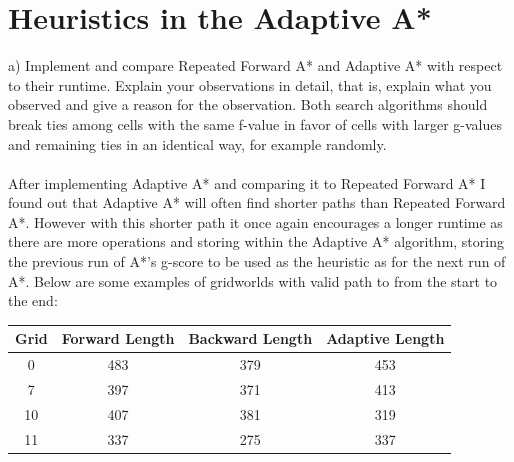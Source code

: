 \documentclass{article}
\begin{document}
\section{Heuristics in the Adaptive A*}
a) Implement and compare Repeated Forward A* and Adaptive A* with respect to their runtime. Explain your observations in detail, that is, explain what you observed and give a reason for
the observation. Both search algorithms should break ties among cells with the same f-value in favor of cells with larger g-values and remaining ties in an identical way, for example randomly.\\\\
After implementing Adaptive A* and comparing it to Repeated Forward A* I found out that Adaptive A* will often find shorter paths than Repeated Forward A*. However with this shorter path it once again encourages a longer runtime as there are more operations and storing within the Adaptive A* algorithm, storing the previous run of A*'s g-score to be used as the heuristic as for the next run of A*. Below are some examples of gridworlds with valid path to from the start to the end: 
\begin{center}
\begin{tabular}{ |c|c|c|c| } 
\hline
Grid & Forward Length & Backward Length & Adaptive Length\\
\hline
0 & 483 & 379 & 453\\
7 & 397 & 371 & 413\\
10 & 407 & 381 & 319\\
11 & 337 & 275 & 337\\
\hline
\end{tabular}
\end{center}
\end{document}
